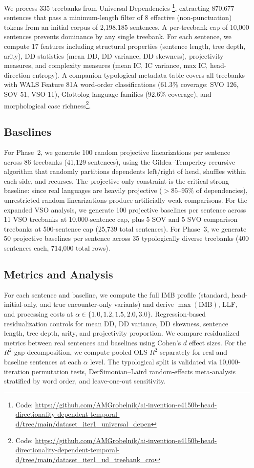 \documentclass[11pt,letterpaper]{article}
\begin{document}
We process 335 treebanks from Universal Dependencies \citep{deMarneffe2021}\footnote{Code: \url{https://github.com/AMGrobelnik/ai-invention-e4150b-head-directionality-dependent-temporal-d/tree/main/dataset_iter1_universal_depen}}, extracting 870,677 sentences that pass a minimum-length filter of 8 effective (non-punctuation) tokens from an initial corpus of 2,198,185 sentences. A per-treebank cap of 10,000 sentences prevents dominance by any single treebank. For each sentence, we compute 17 features including structural properties (sentence length, tree depth, arity), DD statistics (mean DD, DD variance, DD skewness), projectivity measures, and complexity measures (mean IC, IC variance, max IC, head-direction entropy). A companion typological metadata table covers all treebanks with WALS Feature 81A word-order classifications (61.3\% coverage: SVO 126, SOV 51, VSO 11), Glottolog language families (92.6\% coverage), and morphological case richness\footnote{Code: \url{https://github.com/AMGrobelnik/ai-invention-e4150b-head-directionality-dependent-temporal-d/tree/main/dataset_iter1_ud_treebank_cro}}.

\subsection{Baselines}

For Phase~2, we generate 100 random projective linearizations per sentence across 86 treebanks (41,129 sentences), using the Gildea--Temperley recursive algorithm \citep{Gildea2007} that randomly partitions dependents left/right of head, shuffles within each side, and recurses. The projective-only constraint is the critical strong baseline: since real languages are heavily projective ($>$85--95\% of dependencies), unrestricted random linearizations produce artificially weak comparisons. For the expanded VSO analysis, we generate 100 projective baselines per sentence across 11 VSO treebanks at 10,000-sentence cap, plus 5 SOV and 5 SVO comparison treebanks at 500-sentence cap (25,739 total sentences). For Phase~3, we generate 50 projective baselines per sentence across 35 typologically diverse treebanks (400 sentences each, 714,000 total rows).

\subsection{Metrics and Analysis}

For each sentence and baseline, we compute the full IMB profile (standard, head-initial-only, and true encounter-only variants) and derive $\max(\text{IMB})$, LLF, and processing costs at $\alpha \in \{1.0, 1.2, 1.5, 2.0, 3.0\}$. Regression-based residualization controls for mean DD, DD variance, DD skewness, sentence length, tree depth, arity, and projectivity proportion. We compare residualized metrics between real sentences and baselines using Cohen's $d$ effect sizes. For the $R^2$ gap decomposition, we compute pooled OLS $R^2$ separately for real and baseline sentences at each $\alpha$ level. The typological split is validated via 10,000-iteration permutation tests, DerSimonian--Laird random-effects meta-analysis stratified by word order, and leave-one-out sensitivity.
\end{document}

